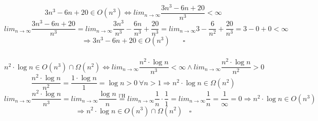 \documentclass{article}
\begin{document}
\subsubsection{}
\[
	3n^3-6n+20 \in O(n^3) \Leftrightarrow lim_{n\rightarrow\infty}\frac{3n^3-6n+20}{n^3} < \infty
\]
\[
	lim_{n\rightarrow\infty}\frac{3n^3-6n+20}{n^3} = lim_{n\rightarrow\infty} \frac{3n^3}{n^3}-\frac{6n}{n^3}+\frac{20}{n^3}=lim_{n\rightarrow\infty}3-\frac{6}{n^2}+\frac{20}{n^3}=3-0+0<\infty
\]
\[
	\Rightarrow 3n^3-6n+20 \in O(n^3)  ~~~~~~~~\square
\]
\subsubsection{}
\[
	n^2 \cdot \operatorname{log} n \in O(n^3) \cap \Omega(n^2) \Leftrightarrow lim_{n\rightarrow\infty} \frac{n^2 \cdot \operatorname{log} n}{n^3} < \infty \land lim_{n\rightarrow\infty} \frac{n^2 \cdot \operatorname{log} n}{n^2} > 0
\]
\[
	\frac{n^2 \cdot \operatorname{log} n}{n^2} = \frac{1 \cdot \operatorname{log} n}{1} = \operatorname{log} n > 0~ \forall n > 1 \Rightarrow n^2 \cdot \operatorname{log} n \in \Omega(n^2)
\]
\[
	lim_{n\rightarrow\infty} \frac{n^2 \cdot \operatorname{log} n}{n^3} = lim_{n\rightarrow\infty} \frac{\operatorname{log} n}{n} \overset{\text{l'H}}{=} lim_{n\rightarrow\infty}\frac{1}{n} \cdot \frac{1}{1} = lim_{n\rightarrow\infty} \frac{1}{n} = \frac{1}{\infty} = 0 \Rightarrow n^2\cdot\operatorname{log} n \in  O(n^3)
\]
\[
	\Rightarrow n^2 \cdot \operatorname{log} n \in O(n^3) \cap \Omega(n^2)~~~~\square
\]
\end{document}
